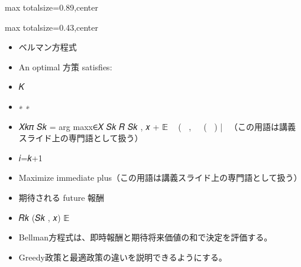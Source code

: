 \begin{minipage}[t]{0.58\textwidth}
\begin{adjustbox}{max totalsize={\textwidth}{0.89\textheight},center}
\begin{minipage}{\textwidth}
\end{minipage}
\end{adjustbox}
\end{minipage}


\clearpage
{}
\begin{minipage}[t]{0.405\textwidth}
\begin{adjustbox}{max totalsize={\textwidth}{0.43\textheight},center}
\begin{minipage}{\textwidth}\scriptsize
{}\begin{itemize}
\item ベルマン方程式
\item An optimal 方策 satisfies:
\item 𝐾
\item ∗ ∗
\item 𝑋𝑘𝜋 𝑆𝑘 = arg maxx∈𝑋 𝑆𝑘 𝑅 𝑆𝑘 , 𝑥 + 𝔼 ෍ 𝑅(𝑆𝑖 , 𝑋𝑖𝜋 (𝑆𝑖 ) |𝑆𝑘𝑥（この用語は講義スライド上の専門語として扱う）
\item 𝑖=𝑘+1
\item Maximize immediate plus（この用語は講義スライド上の専門語として扱う）
\item 期待される future 報酬
\item 𝑅𝑘 (𝑆𝑘 , 𝑥) 𝔼
\end{itemize}\begin{itemize}
\item Bellman方程式は、即時報酬と期待将来価値の和で決定を評価する。
\item Greedy政策と最適政策の違いを説明できるようにする。
\end{itemize}
\end{minipage}
\end{adjustbox}
\end{minipage}\hfill
